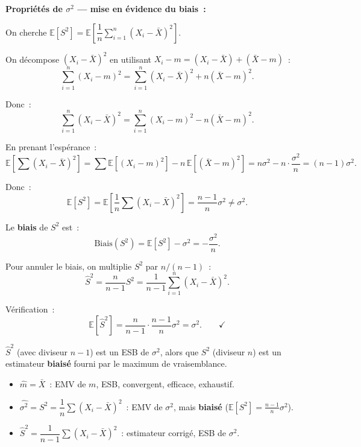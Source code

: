 \documentclass[11pt,a4paper]{article}
\newcommand{\E}{\mathbb{E}}
\newcommand{\biais}[1]{\mathrm{Biais}(#1)}
\begin{document}
\textbf{Propri\'et\'es de $\widehat{\sigma^2}$ --- mise en \'evidence du biais~:}

\begin{demobox}
On cherche $\E[S^2]=\E\!\left[\dfrac{1}{n}\sum_{i=1}^n(X_i-\bar X)^2\right]$.

On d\'ecompose $(X_i-\bar X)^2$ en utilisant $X_i-m=(X_i-\bar X)+(\bar X-m)$~:
$$\sum_{i=1}^n(X_i-m)^2
  = \sum_{i=1}^n(X_i-\bar X)^2 + n(\bar X-m)^2.$$

Donc~:
$$\sum_{i=1}^n(X_i-\bar X)^2 = \sum_{i=1}^n(X_i-m)^2 - n(\bar X-m)^2.$$

En prenant l'esp\'erance~:
$$\E\!\left[\sum(X_i-\bar X)^2\right]
  = \sum\E\!\left[(X_i-m)^2\right] - n\,\E\!\left[(\bar X-m)^2\right]
  = n\sigma^2 - n\cdot\frac{\sigma^2}{n}
  = (n-1)\sigma^2.$$

Donc~:
$$\E[S^2] = \E\!\left[\frac{1}{n}\sum(X_i-\bar X)^2\right]
  = \frac{n-1}{n}\sigma^2 \neq \sigma^2.$$

Le \textbf{biais} de $S^2$ est~:
$$\biais{S^2} = \E[S^2]-\sigma^2 = -\frac{\sigma^2}{n}.$$
\end{demobox}

\begin{demobox}
Pour annuler le biais, on multiplie $S^2$ par $n/(n-1)$~:
$$\hat S^2 = \frac{n}{n-1}S^2 = \frac{1}{n-1}\sum_{i=1}^n(X_i-\bar X)^2.$$

V\'erification~:
$$\E[\hat S^2] = \frac{n}{n-1}\cdot\frac{n-1}{n}\sigma^2 = \sigma^2. \qquad\checkmark$$

$\hat S^2$ (avec diviseur $n-1$) est un ESB de $\sigma^2$, alors que $S^2$ (diviseur $n$) est un estimateur \textbf{biais\'e} fourni par le maximum de vraisemblance.
\end{demobox}

\begin{methbox}
\begin{itemize}
  \item $\hat m = \bar X$~: EMV de $m$, ESB, convergent, efficace, exhaustif.
  \item $\widehat{\sigma^2} = S^2 = \dfrac{1}{n}\displaystyle\sum(X_i-\bar X)^2$~: EMV de $\sigma^2$, mais \textbf{biais\'e} ($\E[S^2]=\frac{n-1}{n}\sigma^2$).
  \item $\hat S^2 = \dfrac{1}{n-1}\displaystyle\sum(X_i-\bar X)^2$~: estimateur corrig\'e, ESB de $\sigma^2$.
\end{itemize}
\end{methbox}
\end{document}
